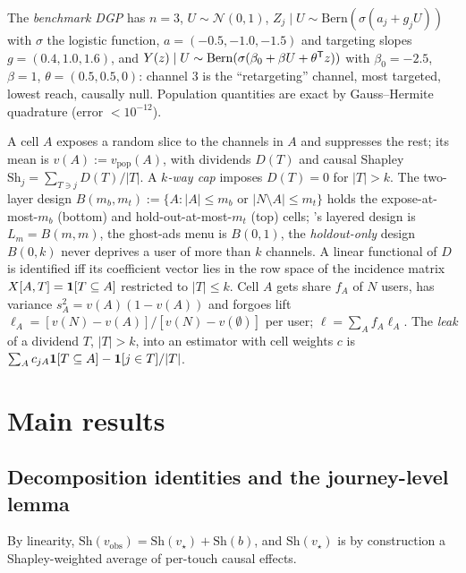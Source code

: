 The \emph{benchmark DGP} has $n = 3$, $U \sim \mathcal N(0,1)$, $Z_j \mid U \sim \mathrm{Bern}(\sigma(a_j + g_j U))$ with $\sigma$ the logistic function, $a = (-0.5, -1.0, -1.5)$ and targeting slopes $g = (0.4, 1.0, 1.6)$, and $Y(z) \mid U \sim \mathrm{Bern}(\sigma(\beta_0 + \beta U + \theta^{\mathsf{T}} z))$ with $\beta_0 = -2.5$, $\beta = 1$, $\theta = (0.5, 0.5, 0)$: channel 3 is the ``retargeting'' channel, most targeted, lowest reach, causally null. Population quantities are exact by Gauss--Hermite quadrature (error $< 10^{-12}$).

\begin{definition}
\label{attr:def:design}
A cell $A$ exposes a random slice to the channels in $A$ and suppresses the rest; its mean is $v(A) := v_{\mathrm{pop}}(A)$, with dividends $D(T)$ and causal Shapley $\mathrm{Sh}_j = \sum_{T \ni j} D(T)/|T|$. A \emph{$k$-way cap} imposes $D(T) = 0$ for $|T| > k$. The two-layer design $B(m_b, m_t) := \{A : |A| \le m_b \text{ or } |N \setminus A| \le m_t\}$ holds the expose-at-most-$m_b$ (bottom) and hold-out-at-most-$m_t$ (top) cells; 's layered design is $L_m = B(m,m)$, the ghost-ads menu is $B(0,1)$, the \emph{holdout-only} design $B(0,k)$ never deprives a user of more than $k$ channels. A linear functional of $D$ is identified iff its coefficient vector lies in the row space of the incidence matrix $X[A,T] = \mathbf{1}[T \subseteq A]$ restricted to $|T| \le k$. Cell $A$ gets share $f_A$ of $N$ users, has variance $s_A^2 = v(A)(1 - v(A))$ and forgoes lift $\ell_A = [v(N) - v(A)]/[v(N) - v(\emptyset)]$ per user; $\ell = \sum_A f_A \ell_A$. The \emph{leak} of a dividend $T$, $|T| > k$, into an estimator with cell weights $c$ is $\sum_A c_{jA}\mathbf{1}[T \subseteq A] - \mathbf{1}[j \in T]/|T|$.
\end{definition}

\section{Main results}

\subsection{Decomposition identities and the journey-level lemma}

By linearity, $\mathrm{Sh}(v_{\mathrm{obs}}) = \mathrm{Sh}(v_\star) + \mathrm{Sh}(b)$, and $\mathrm{Sh}(v_\star)$ is by construction a Shapley-weighted average of per-touch causal effects.

